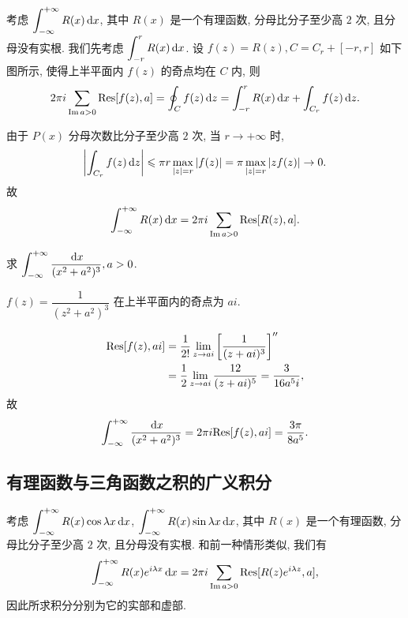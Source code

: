 考虑 $\displaystyle\int_{-\infty}^{+\infty}R(x)\,\mathrm{d} x$, 其中 $R(x)$ 是一个有理函数, 分母比分子至少高 $2$ 次, 且分母没有实根.
我们先考虑 $\displaystyle\int_{-r}^rR(x)\,\mathrm{d} x$.
设 $f(z)=R(z),C=C_r+[-r,r]$ 如下图所示, 使得上半平面内 $f(z)$ 的奇点均在 $C$ 内,
则
\[2\pi i\sum_{\operatorname{Im} a>0}{\mathrm{Res}}[f(z),a]=\oint_Cf(z)\,\mathrm{d} z=\int_{-r}^rR(x)\,\mathrm{d} x+\int_{C_r}f(z)\,\mathrm{d} z.\]

\begin{center}
\end{center}

由于 $P(x)$ 分母次数比分子至少高 $2$ 次,
当 $r\to+\infty$ 时,
\[\left|\int_{C_r}f(z)\,\mathrm{d} z\right|\leqslant \pi r\max_{|z|=r}|f(z)|
=\pi \max_{|z|=r}|zf(z)|\to 0.\]
故
	\[\int_{-\infty}^{+\infty}R(x)\,\mathrm{d} x=2\pi i\sum_{\operatorname{Im} a>0}{\mathrm{Res}}[R(z),a].\]

\begin{example}
	求 $\displaystyle\int_{-\infty}^{+\infty}\frac{\,\mathrm{d} x}{(x^2+a^2)^3},a>0$.
\end{example}

\begin{solution}
	$f(z)=\dfrac1{(z^2+a^2)^3}$ 在上半平面内的奇点为 $ai$.

	{
		\begin{align*}
		{\mathrm{Res}}[f(z),ai]&=\frac1{2!}\lim_{z\to ai}\left[\frac1{(z+ai)^3}\right]''\\
		&=\frac{1}{2}\lim_{z\to ai}\frac{12}{(z+ai)^5}=\frac{3}{16a^5i},
		\end{align*}故
		\[\int_{-\infty}^{+\infty}\frac{\,\mathrm{d} x}{(x^2+a^2)^3}
	=2\pi i{\mathrm{Res}}[f(z),ai]=\frac{3\pi}{8a^5}.\]
	}
\end{solution}

\subsection{有理函数与三角函数之积的广义积分}

考虑 $\displaystyle\int_{-\infty}^{+\infty}R(x)\cos{\lambda x}\,\mathrm{d} x$, $\displaystyle\int_{-\infty}^{+\infty}R(x)\sin{\lambda x}\,\mathrm{d} x$, 其中 $R(x)$ 是一个有理函数, 分母比分子至少高 $2$ 次, 且分母没有实根.
和前一种情形类似, 我们有
	\[\int_{-\infty}^{+\infty}R(x)e^{i\lambda x}\,\mathrm{d} x
	=2\pi i\sum_{\operatorname{Im} a>0}{\mathrm{Res}}[R(z)e^{i\lambda z},a],\]
因此所求积分分别为它的实部和虚部.


